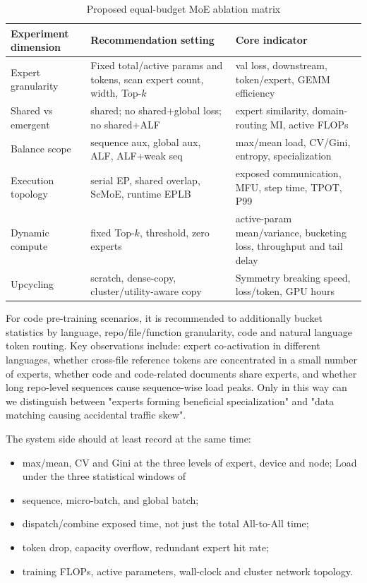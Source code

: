 \documentclass[10pt,a4paper,fontset=none]{ctexart}
\begin{document}
\begin{table}[htbp]
\centering
\caption{Proposed equal-budget MoE ablation matrix}
\label{tab:experiments}
\small
\begin{tabularx}{\textwidth}{p{}p{}Y}
\toprule
Experiment dimension & Recommendation setting & Core indicator \\
\midrule
Expert granularity & Fixed total/active params and tokens, scan expert count, width, Top-$k$ & val loss, downstream, token/expert, GEMM efficiency \\
Shared vs emergent & shared; no shared+global loss; no shared+ALF & expert similarity, domain-routing MI, active FLOPs \\
Balance scope & sequence aux, global aux, ALF, ALF+weak seq & max/mean load, CV/Gini, entropy, specialization \\
Execution topology & serial EP, shared overlap, ScMoE, runtime EPLB & exposed communication, MFU, step time, TPOT, P99 \\
Dynamic compute & fixed Top-$k$, threshold, zero experts & active-param mean/variance, bucketing loss, throughput and tail delay \\
Upcycling & scratch, dense-copy, cluster/utility-aware copy & Symmetry breaking speed, loss/token, GPU hours \\
\bottomrule
\end{tabularx}
\end{table}

For code pre-training scenarios, it is recommended to additionally bucket statistics by language, repo/file/function granularity, code and natural language token routing. Key observations include: expert co-activation in different languages, whether cross-file reference tokens are concentrated in a small number of experts, whether code and code-related documents share experts, and whether long repo-level sequences cause sequence-wise load peaks. Only in this way can we distinguish between "experts forming beneficial specialization" and "data matching causing accidental traffic skew".

The system side should at least record at the same time:
\begin{itemize}
\item max/mean, CV and Gini at the three levels of expert, device and node;
Load under the three statistical windows of \item sequence, micro-batch, and global batch;
\item dispatch/combine exposed time, not just the total All-to-All time;
  \item token drop, capacity overflow, redundant expert hit rate;
\item training FLOPs, active parameters, wall-clock and cluster network topology.
\end{itemize}
\end{document}
